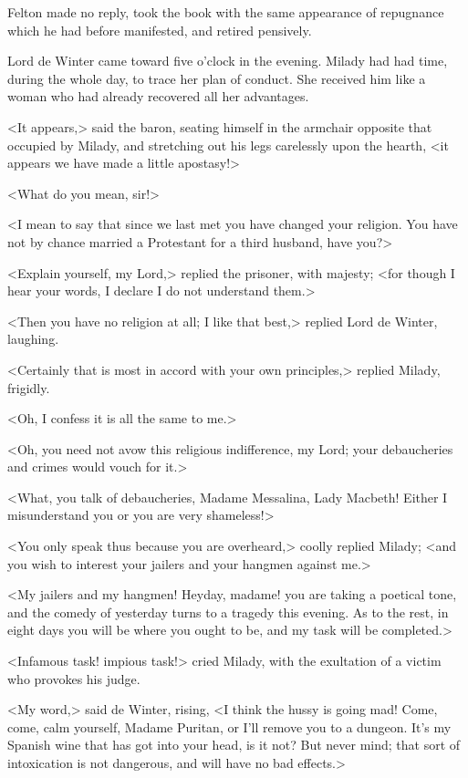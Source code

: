 Felton made no reply, took the book with the same appearance of repugnance which he had before manifested, and retired pensively. 

Lord de Winter came toward five o'clock in the evening. Milady had had time, during the whole day, to trace her plan of conduct. She received him like a woman who had already recovered all her advantages. 

<It appears,> said the baron, seating himself in the armchair opposite that occupied by Milady, and stretching out his legs carelessly upon the hearth, <it appears we have made a little apostasy!> 

<What do you mean, sir!> 

<I mean to say that since we last met you have changed your religion. You have not by chance married a Protestant for a third husband, have you?> 

<Explain yourself, my Lord,> replied the prisoner, with majesty; <for though I hear your words, I declare I do not understand them.> 

<Then you have no religion at all; I like that best,> replied Lord de Winter, laughing. 

<Certainly that is most in accord with your own principles,> replied Milady, frigidly. 

<Oh, I confess it is all the same to me.> 

<Oh, you need not avow this religious indifference, my Lord; your debaucheries and crimes would vouch for it.> 

<What, you talk of debaucheries, Madame Messalina, Lady Macbeth! Either I misunderstand you or you are very shameless!> 

<You only speak thus because you are overheard,> coolly replied Milady; <and you wish to interest your jailers and your hangmen against me.> 

<My jailers and my hangmen! Heyday, madame! you are taking a poetical tone, and the comedy of yesterday turns to a tragedy this evening. As to the rest, in eight days you will be where you ought to be, and my task will be completed.> 

<Infamous task! impious task!> cried Milady, with the exultation of a victim who provokes his judge. 

<My word,> said de Winter, rising, <I think the hussy is going mad! Come, come, calm yourself, Madame Puritan, or I'll remove you to a dungeon. It's my Spanish wine that has got into your head, is it not? But never mind; that sort of intoxication is not dangerous, and will have no bad effects.> 

